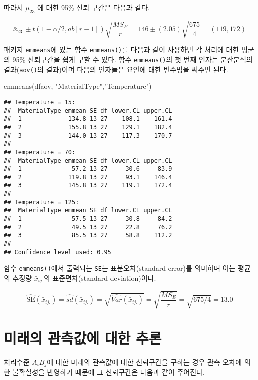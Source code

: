 \documentclass[
]{book}
\newenvironment{Shaded}{\begin{snugshade}}{\end{snugshade}}
\newcommand{\FunctionTok}[1]{\textcolor[rgb]{0.00,0.00,0.00}{#1}}
\newcommand{\NormalTok}[1]{#1}
\newcommand{\StringTok}[1]{\textcolor[rgb]{0.31,0.60,0.02}{#1}}
\begin{document}
따라서 \(\mu_{23}\) 에 대한 95\% 신뢰 구간은 다음과 같다.

\[ \bar x_{23.} \pm t(1-\alpha/2, ab[r-1]) \sqrt{ \frac{MS_E}{r}} = 146 \pm (2.05)\sqrt{\frac{675}{4}} = (119, 172) \]

패키지 \texttt{emmeans}에 있는 함수 \texttt{emmeans()}를 다음과 같이 사용하면 각 처리에 대한 평균의 95\% 신뢰구간을 쉽게 구할 수 있다. 함수 \texttt{emmeans()}의 첫 번째 인자는 분산분석의 결과(\texttt{aov()}의 결과)이며 다음의 인자들은 요인에 대한 변수명을 써주면 된다.

\begin{Shaded}
\begin{Highlighting}[]
\FunctionTok{emmeans}\NormalTok{(dfaov, }\StringTok{"MaterialType"}\NormalTok{,}\StringTok{"Temperature"}\NormalTok{)}
\end{Highlighting}
\end{Shaded}

\begin{verbatim}
## Temperature = 15:
##  MaterialType emmean SE df lower.CL upper.CL
##  1             134.8 13 27    108.1    161.4
##  2             155.8 13 27    129.1    182.4
##  3             144.0 13 27    117.3    170.7
## 
## Temperature = 70:
##  MaterialType emmean SE df lower.CL upper.CL
##  1              57.2 13 27     30.6     83.9
##  2             119.8 13 27     93.1    146.4
##  3             145.8 13 27    119.1    172.4
## 
## Temperature = 125:
##  MaterialType emmean SE df lower.CL upper.CL
##  1              57.5 13 27     30.8     84.2
##  2              49.5 13 27     22.8     76.2
##  3              85.5 13 27     58.8    112.2
## 
## Confidence level used: 0.95
\end{verbatim}

함수 \texttt{emmeans()}에서 출력되는 \texttt{SE}는 표분오차(standard error)를 의미하며 이는 평균의 추정량 \(\bar x_{ij.}\)의 표준편차(standard deviation)이다.

\[  \hat{\text{SE}}(\bar x_{ij.}) = \hat{ sd} (\bar x_{ij.}) = \sqrt{ \hat {Var} (\bar x_{ij.})}
= \sqrt{\frac{MS_E}{r}} = \sqrt{675/4} = 13.0 \]

\hypertarget{uxbbf8uxb798uxc758-uxad00uxce21uxac12uxc5d0-uxb300uxd55c-uxcd94uxb860}{%
\section{미래의 관측값에 대한 추론}\label{uxbbf8uxb798uxc758-uxad00uxce21uxac12uxc5d0-uxb300uxd55c-uxcd94uxb860}}

처리수준 \(A_iB_j\)에 대한 미래의 관측값에 대한 신뢰구간을 구하는 경우 관측 오차에 의한 불확실성을 반영하기 때문에 그 신뢰구간은 다음과 같이 주어진다.
\end{document}
